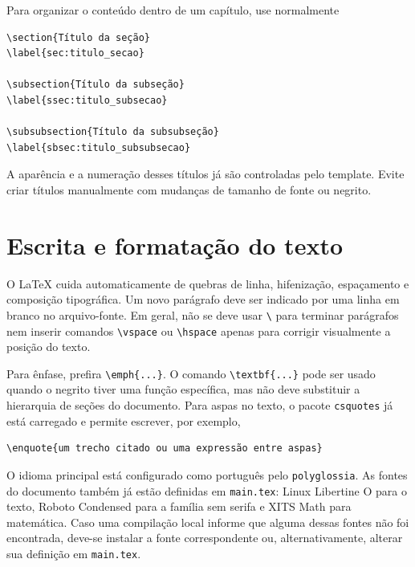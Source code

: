 Para organizar o conteúdo dentro de um capítulo, use normalmente

\begin{verbatim}
\section{Título da seção}
\label{sec:titulo_secao}

\subsection{Título da subseção}
\label{ssec:titulo_subsecao}

\subsubsection{Título da subsubseção}
\label{sbsec:titulo_subsubsecao}
\end{verbatim}

A aparência e a numeração desses títulos já são controladas pelo template. Evite criar títulos manualmente com mudanças de tamanho de fonte ou negrito.

\section{Escrita e formatação do texto}
\label{sec:escrita_formatacao}

O LaTeX cuida automaticamente de quebras de linha, hifenização, espaçamento e composição tipográfica. Um novo parágrafo deve ser indicado por uma linha em branco no arquivo-fonte. Em geral, não se deve usar \verb|\| para terminar parágrafos nem inserir comandos \verb|\vspace| ou \verb|\hspace| apenas para corrigir visualmente a posição do texto.

Para ênfase, prefira \verb|\emph{...}|. O comando \verb|\textbf{...}| pode ser usado quando o negrito tiver uma função específica, mas não deve substituir a hierarquia de seções do documento. Para aspas no texto, o pacote \verb|csquotes| já está carregado e permite escrever, por exemplo,

\begin{verbatim}
\enquote{um trecho citado ou uma expressão entre aspas}
\end{verbatim}

O idioma principal está configurado como português pelo \verb|polyglossia|. As fontes do documento também já estão definidas em \verb|main.tex|: Linux Libertine O para o texto, Roboto Condensed para a família sem serifa e XITS Math para matemática. Caso uma compilação local informe que alguma dessas fontes não foi encontrada, deve-se instalar a fonte correspondente ou, alternativamente, alterar sua definição em \verb|main.tex|.

